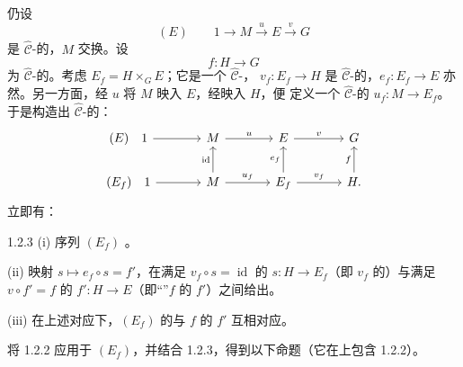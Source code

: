 仍设
\[
 (E)\qquad 1\longrightarrow M\xrightarrow{u}E\xrightarrow{v}G
\]
是 $\widehat{\mathcal C}$-的，$M$ 交换。设
\[
 f:H\longrightarrow G
\]
为 $\widehat{\mathcal C}$-的。考虑 $E_f=H\times_G E$；它是一个 $\widehat{\mathcal C}$-， $v_f:E_f\to H$ 是 $\widehat{\mathcal C}$-的，$e_f:E_f\to E$ 亦然。另一方面，经 $u$ 将 $M$ 映入 $E$，经映入 $H$，便
定义一个 $\widehat{\mathcal C}$-的 $u_f:M\to E_f$。于是构造出 $\widehat{\mathcal C}$-的：
\[
\begin{tikzcd}[column sep=large]
 (E)\quad 1\arrow[r]&M\arrow[r,"u"]&E\arrow[r,"v"]&G\\
 (E_f)\quad 1\arrow[r]&M\arrow[u,"\operatorname{id}"]\arrow[r,"u_f"]&E_f\arrow[u,"e_f"]\arrow[r,"v_f"]&H\arrow[u,"f"] .
\end{tikzcd}
\]
立即有：
\begin{SGAresult}{}{1.2.3}
(i) 序列 $(E_f)$ 。

(ii) 映射 $s\mapsto e_f\circ s=f'$，在满足 $v_f\circ s=\operatorname{id}$ 的 $s:H\to E_f$（即 $v_f$ 的）与满足 $v\circ f'=f$ 的 $f':H\to E$（即“”$f$ 的 $f'$）之间给出。

(iii) 在上述对应下，$(E_f)$ 的与 $f$ 的 $f'$ 互相对应。
\end{SGAresult}
将 1.2.2 应用于 $(E_f)$，并结合 1.2.3，得到以下命题（它在上包含 1.2.2）。
